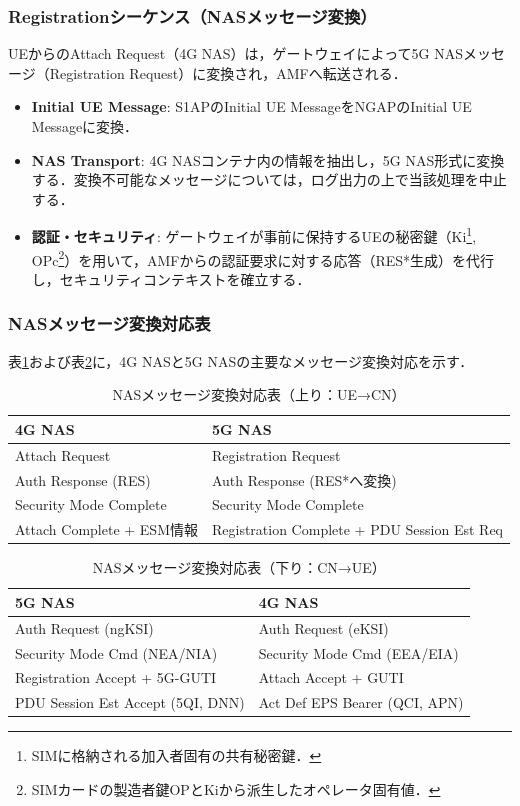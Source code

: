 \subsubsection{Registrationシーケンス（NASメッセージ変換）}
UEからのAttach Request（4G NAS）は，ゲートウェイによって5G NASメッセージ（Registration Request）に変換され，AMFへ転送される．
\begin{itemize}
	\item \textbf{Initial UE Message}: S1APのInitial UE MessageをNGAPのInitial UE Messageに変換．
	\item \textbf{NAS Transport}: 4G NASコンテナ内の情報を抽出し，5G NAS形式に変換する．変換不可能なメッセージについては，ログ出力の上で当該処理を中止する．
	\item \textbf{認証・セキュリティ}: ゲートウェイが事前に保持するUEの秘密鍵（Ki\footnote{SIMに格納される加入者固有の共有秘密鍵．}, OPc\footnote{SIMカードの製造者鍵OPとKiから派生したオペレータ固有値．}）を用いて，AMFからの認証要求に対する応答（RES*生成）を代行し，セキュリティコンテキストを確立する．
\end{itemize}

\subsubsection{NASメッセージ変換対応表}
表\ref{tab:nas_conversion_ul}および表\ref{tab:nas_conversion_dl}に，4G NAS\cite{3GPP_TS24301}と5G NAS\cite{3GPP_TS24501}の主要なメッセージ変換対応を示す．

\begin{table}[htbp]
\centering
\caption{NASメッセージ変換対応表（上り：UE→CN）}
\label{tab:nas_conversion_ul}
\begin{tabular}{|l|l|}
\hline
\textbf{4G NAS} & \textbf{5G NAS} \\
\hline
Attach Request & Registration Request \\
\hline
Auth Response (RES) & Auth Response (RES*へ変換) \\
\hline
Security Mode Complete & Security Mode Complete \\
\hline
Attach Complete + ESM情報 & Registration Complete + PDU Session Est Req \\
\hline
\end{tabular}
\end{table}

\begin{table}[htbp]
\centering
\caption{NASメッセージ変換対応表（下り：CN→UE）}
\label{tab:nas_conversion_dl}
\begin{tabular}{|l|l|}
\hline
\textbf{5G NAS} & \textbf{4G NAS} \\
\hline
Auth Request (ngKSI) & Auth Request (eKSI) \\
\hline
Security Mode Cmd (NEA/NIA) & Security Mode Cmd (EEA/EIA) \\
\hline
Registration Accept + 5G-GUTI & Attach Accept + GUTI \\
\hline
PDU Session Est Accept (5QI, DNN) & Act Def EPS Bearer (QCI, APN) \\
\hline
\end{tabular}
\end{table}

